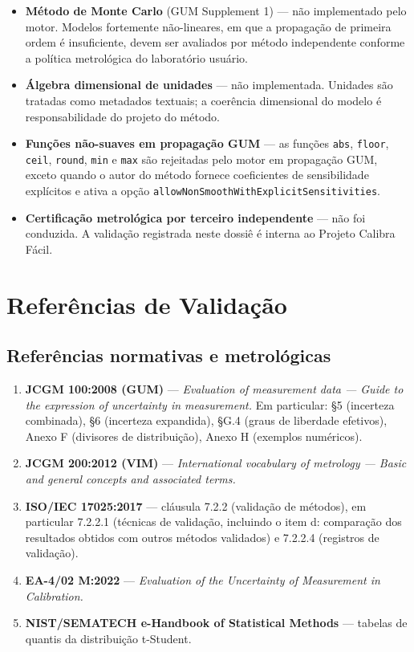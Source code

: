 \documentclass[11pt,a4paper]{article}
\newcommand{\organizationName}{Projeto Calibra Fácil}
\begin{document}
\begin{itemize}
  \item \textbf{Método de Monte Carlo} (GUM Supplement 1) --- não implementado pelo motor. Modelos fortemente não-lineares, em que a propagação de primeira ordem é insuficiente, devem ser avaliados por método independente conforme a política metrológica do laboratório usuário.
  \item \textbf{Álgebra dimensional de unidades} --- não implementada. Unidades são tratadas como metadados textuais; a coerência dimensional do modelo é responsabilidade do projeto do método.
  \item \textbf{Funções não-suaves em propagação GUM} --- as funções \texttt{abs}, \texttt{floor}, \texttt{ceil}, \texttt{round}, \texttt{min} e \texttt{max} são rejeitadas pelo motor em propagação GUM, exceto quando o autor do método fornece coeficientes de sensibilidade explícitos e ativa a opção \texttt{allowNonSmoothWithExplicitSensitivities}.
  \item \textbf{Certificação metrológica por terceiro independente} --- não foi conduzida. A validação registrada neste dossiê é interna ao \organizationName{}.
\end{itemize}

\section{Referências de Validação}
\label{sec:referencias}

\subsection{Referências normativas e metrológicas}

\begin{enumerate}[label=R\arabic*., leftmargin=2.6em]
  \item \textbf{JCGM 100:2008 (GUM)} --- \emph{Evaluation of measurement data --- Guide to the expression of uncertainty in measurement.} Em particular: §5 (incerteza combinada), §6 (incerteza expandida), §G.4 (graus de liberdade efetivos), Anexo F (divisores de distribuição), Anexo H (exemplos numéricos).
  \item \textbf{JCGM 200:2012 (VIM)} --- \emph{International vocabulary of metrology --- Basic and general concepts and associated terms.}
  \item \textbf{ISO/IEC 17025:2017} --- cláusula 7.2.2 (validação de métodos), em particular 7.2.2.1 (técnicas de validação, incluindo o item d: comparação dos resultados obtidos com outros métodos validados) e 7.2.2.4 (registros de validação).
  \item \textbf{EA-4/02 M:2022} --- \emph{Evaluation of the Uncertainty of Measurement in Calibration.}
  \item \textbf{NIST/SEMATECH e-Handbook of Statistical Methods} --- tabelas de quantis da distribuição t-Student.
\end{enumerate}
\end{document}
